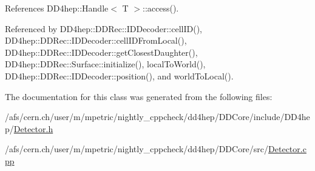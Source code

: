 References DD4hep::Handle$<$ T $>$::access().

Referenced by DD4hep::DDRec::IDDecoder::cellID(), DD4hep::DDRec::IDDecoder::cellIDFromLocal(), DD4hep::DDRec::IDDecoder::getClosestDaughter(), DD4hep::DDRec::Surface::initialize(), localToWorld(), DD4hep::DDRec::IDDecoder::position(), and worldToLocal().

The documentation for this class was generated from the following files:\begin{DoxyCompactItemize}
\item 
/afs/cern.ch/user/m/mpetric/nightly\_\-cppcheck/dd4hep/DDCore/include/DD4hep/\hyperlink{_detector_8h}{Detector.h}\item 
/afs/cern.ch/user/m/mpetric/nightly\_\-cppcheck/dd4hep/DDCore/src/\hyperlink{_detector_8cpp}{Detector.cpp}\end{DoxyCompactItemize}
